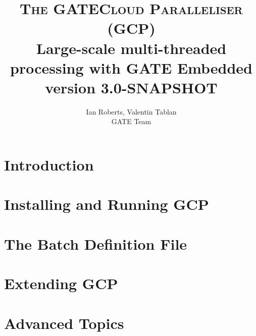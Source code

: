 \documentclass[10pt, a4paper, twoside]{report}
\begin{document}
\title{{\Huge {\textsc{The GATECloud Paralleliser (GCP)}}}\\
Large-scale multi-threaded processing with GATE Embedded \\
{\small version 3.0-SNAPSHOT}
}
\author{Ian Roberts, Valentin Tablan\\GATE Team}

\thispagestyle{empty}
\maketitle


\clearpage

\setcounter{tocdepth}{2}
\tableofcontents

\thispagestyle{empty}
\cleardoublepage

\pagestyle{fancy}
\fancyhead{} %

\chapter{Introduction}\label{chap:intro}


\chapter{Installing and Running GCP}\label{chap:install}


\chapter{The Batch Definition File}\label{chap:batch-def}


\chapter{Extending GCP}\label{chap:extending}


\chapter{Advanced Topics}\label{chap:advanced}

\end{document}
